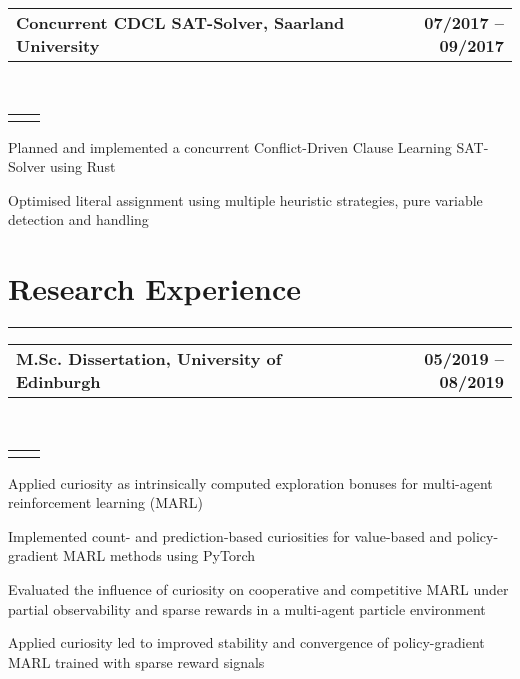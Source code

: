 \documentclass[]{deedy-resume}
\makeatletter
\newcommand{\headerrow}[2]
{\begin{tabular*}{\linewidth}{l@{\extracolsep{\fill}}r}
	\fontspec{Helvetica}\fontsize{12pt}{12pt}\selectfont\bfseries{\color{subheadings}#1} &
	\fontspec{Helvetica}\fontsize{12pt}{12pt}\selectfont\bfseries{\color{subheadings}#2} \\
\end{tabular*}}
\newcommand{\locationrow}[2]
{\begin{tabular*}{\linewidth}{l@{\extracolsep{\fill}}r}
        \color{headings}\scshape\fontspec{Heiti TC Medium}\fontsize{10pt}{12pt}\selectfont{#1}  &
        \color{headings}\scshape\fontspec{Heiti TC Medium}\fontsize{10pt}{12pt}\selectfont{#2}  \\
\end{tabular*}}
\makeatother
\begin{document}
\noindent
\headerrow{Concurrent CDCL SAT-Solver, Saarland University}{07/2017 -- 09/2017}
\\
\locationrow{Group Project for Modern Imperative Programming Languages Seminar}{}
\begin{tightitemize}{1.7em}
    \item Planned and implemented a concurrent Conflict-Driven Clause Learning SAT-Solver using Rust
    \item Optimised literal assignment using multiple heuristic strategies, pure variable detection and handling
\end{tightitemize}
\largesectionsep


\section*{Research Experience}
\hrule
\vspace{0.4em}

\noindent
\headerrow{M.Sc. Dissertation, University of Edinburgh}{05/2019 -- 08/2019}
\\
\locationrow{Autonomous Agents Research Group}{}
\begin{tightitemize}{1.7em}
    \item Applied curiosity as intrinsically computed exploration bonuses for multi-agent reinforcement learning (MARL)
    \item Implemented count- and prediction-based curiosities for value-based and policy-gradient MARL methods using PyTorch
    \item Evaluated the influence of curiosity on cooperative and competitive MARL under partial observability and sparse rewards in a multi-agent particle environment
    \item Applied curiosity led to improved stability and convergence of policy-gradient MARL trained with sparse reward signals
\end{tightitemize}
\largesectionsep

\end{document}
